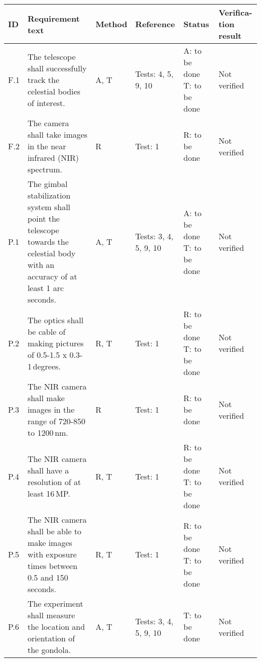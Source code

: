 
\makeatletter
\renewcommand\@makefntext[1]{\leftskip=3em\hskip-1em\@makefnmark#1}
\makeatother

\begin{longtable}[]{|m{}| m{}|m{}|m{}|m{}|m{}|}

\hline
\textbf{ID} & \textbf{Requirement text} & \textbf{Method} & \textbf{Reference} & \textbf{Status} & \textbf{Verifica-tion result} \\\hline
F.1 & The telescope shall successfully track the celestial bodies of interest. 
& A, T & Tests: 4, 5, 9, 10 & A: to be done \newline T: to be done & Not verified \\\hline

F.2 & The camera shall take images in the near infrared (NIR) spectrum.
& R & Test: 1 & R: to be done & Not verified \\\hline

P.1 & The gimbal stabilization system shall point the telescope towards the celestial body with an accuracy of at least 1 arc seconds.
& A, T & Tests: 3, 4, 5, 9, 10 & A: to be done \newline T: to be done & Not verified \\\hline

P.2 & The optics shall be cable of making pictures of 0.5-1.5 x 0.3-1\,degrees.
& R, T & Test: 1 & R: to be done \newline T: to be done & Not verified \\\hline

P.3 & The NIR camera shall make images in the range of 720-850 to 1200\,nm.
& R & Test: 1 & R: to be done & Not verified \\\hline

P.4 & The NIR camera shall have a resolution of at least 16\,MP.
& R, T & Test: 1 & R: to be done \newline T: to be done & Not verified \\\hline

P.5 & The NIR camera shall be able to make images with exposure times between 0.5 and 150\,seconds.
& R, T & Test: 1 & R: to be done \newline T: to be done & Not verified \\\hline

P.6 & The experiment shall measure the location and orientation of the gondola.
& A, T & Tests: 3, 4, 5, 9, 10 & T: to be done & Not verified \\\hline


\end{longtable}
